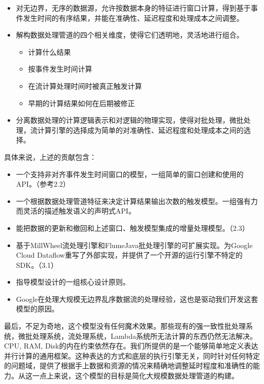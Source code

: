 \documentclass[oneside]{ctexbook}
\begin{document}
\begin{itemize}
\item 对无边界，无序的数据源，允许按数据本身的特征进行窗口计算，得到基于事件发生时间的有序结果，并能在准确性、延迟程度和处理成本之间调整。
\item 解构数据处理管道的四个相关维度，使得它们透明地，灵活地进行组合。

\begin{itemize}
\item 计算什么结果
\item 按事件发生时间计算
\item 在流计算处理时间时被真正触发计算
\item 早期的计算结果如何在后期被修正
\end{itemize}

\item 分离数据处理的计算逻辑表示和对逻辑的物理实现，使得对批处理，微批处理，流计算引擎的选择成为简单的对准确性、延迟程度和处理成本之间的选择。

\end{itemize}

具体来说，上述的贡献包含：

\begin{itemize}

\item 一个支持非对齐事件发生时间窗口的模型，一组简单的窗口创建和使用的API。（参考2.2）
\item 一个根据数据处理管道特征来决定计算结果输出次数的触发模型。一组强有力而灵活的描述触发语义的声明式API。
\item 能把数据的更新和撤回和上述窗口、触发模型集成的增量处理模型。（2.3）
\item 基于MillWheel流处理引擎和FlumeJava批处理引擎的可扩展实现。为Google Cloud Dataflow重写了外部实现，并提供了一个开源的运行引擎不特定的SDK。（3.1）
\item 指导模型设计的一组核心设计原则。
\item Google在处理大规模无边界乱序数据流的处理经验，这也是驱动我们开发这套模型的原因。

\end{itemize}

最后，不足为奇地，这个模型没有任何魔术效果。那些现有的强一致性批处理系统，微批处理系统，流处理系统，Lambda系统所无法计算的东西仍然无法解决。CPU, RAM, Disk的内在约束依然存在。我们所提供的是一个能够简单地定义表达并行计算的通用框架。这种表达的方式和底层的执行引擎无关，同时针对任何特定的问题域，提供了根据手上数据和资源的情况来精确地调整延时程度和准确性的能力。从这一点上来说，这个模型的目标是简化大规模数据处理管道的构建。
\end{document}
